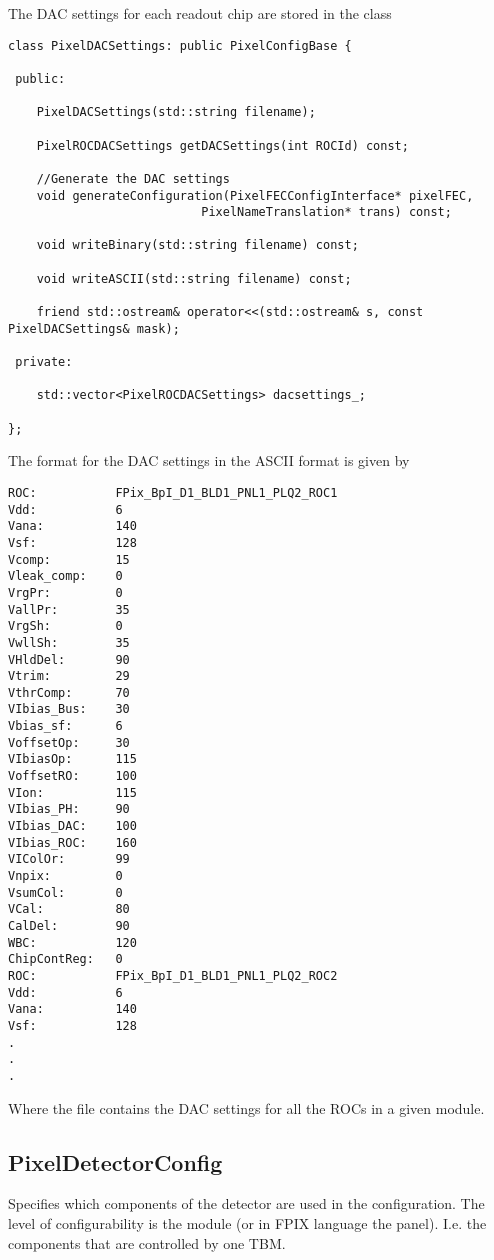 The DAC settings for each readout chip are stored in the class

\begin{verbatim}
class PixelDACSettings: public PixelConfigBase {

 public:

    PixelDACSettings(std::string filename);

    PixelROCDACSettings getDACSettings(int ROCId) const;

    //Generate the DAC settings
    void generateConfiguration(PixelFECConfigInterface* pixelFEC,
	                       PixelNameTranslation* trans) const; 

    void writeBinary(std::string filename) const;

    void writeASCII(std::string filename) const;

    friend std::ostream& operator<<(std::ostream& s, const PixelDACSettings& mask);

 private:

    std::vector<PixelROCDACSettings> dacsettings_;   
 
};

\end{verbatim}
The format for the DAC settings in the ASCII format is given by
\begin{verbatim}
ROC:           FPix_BpI_D1_BLD1_PNL1_PLQ2_ROC1
Vdd:           6
Vana:          140
Vsf:           128
Vcomp:         15
Vleak_comp:    0
VrgPr:         0
VallPr:        35
VrgSh:         0
VwllSh:        35
VHldDel:       90
Vtrim:         29
VthrComp:      70
VIbias_Bus:    30
Vbias_sf:      6
VoffsetOp:     30
VIbiasOp:      115
VoffsetRO:     100
VIon:          115
VIbias_PH:     90
VIbias_DAC:    100
VIbias_ROC:    160
VIColOr:       99
Vnpix:         0
VsumCol:       0
VCal:          80
CalDel:        90
WBC:           120
ChipContReg:   0
ROC:           FPix_BpI_D1_BLD1_PNL1_PLQ2_ROC2
Vdd:           6
Vana:          140
Vsf:           128
.
.
.
\end{verbatim}
Where the file contains the DAC settings for all the ROCs in a given module.

\subsection{PixelDetectorConfig}

Specifies which components of the detector are used in the configuration.
The level of configurability is the module (or in FPIX language 
the panel). I.e. the
components that are controlled by one TBM.

